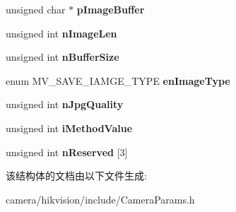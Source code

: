 \begin{DoxyCompactItemize}
unsigned char $\ast$ {\bfseries p\+Image\+Buffer}
\item 
\mbox{\label{struct___m_v___s_a_v_e___i_m_a_g_e___p_a_r_a_m___t___e_x___a0205541f5183ed37ed08929200246b70}} 
unsigned int {\bfseries n\+Image\+Len}
\item 
\mbox{\label{struct___m_v___s_a_v_e___i_m_a_g_e___p_a_r_a_m___t___e_x___a0ebe9f2d85d4b5204df69b5b857420a6}} 
unsigned int {\bfseries n\+Buffer\+Size}
\item 
\mbox{\label{struct___m_v___s_a_v_e___i_m_a_g_e___p_a_r_a_m___t___e_x___a3828a521345bf5d02d8fc4edfde87cee}} 
enum M\+V\+\_\+\+S\+A\+V\+E\+\_\+\+I\+A\+M\+G\+E\+\_\+\+T\+Y\+PE {\bfseries en\+Image\+Type}
\item 
\mbox{\label{struct___m_v___s_a_v_e___i_m_a_g_e___p_a_r_a_m___t___e_x___a14c69f55bfdc48d975534395a95aff03}} 
unsigned int {\bfseries n\+Jpg\+Quality}
\item 
\mbox{\label{struct___m_v___s_a_v_e___i_m_a_g_e___p_a_r_a_m___t___e_x___a66f0092c6e217ac72d484f382233f197}} 
unsigned int {\bfseries i\+Method\+Value}
\item 
\mbox{\label{struct___m_v___s_a_v_e___i_m_a_g_e___p_a_r_a_m___t___e_x___a23bcf831860e8aadda065bc22642400e}} 
unsigned int {\bfseries n\+Reserved} \mbox{[}3\mbox{]}
\end{DoxyCompactItemize}


该结构体的文档由以下文件生成\+:\begin{DoxyCompactItemize}
\item 
camera/hikvision/include/Camera\+Params.\+h\end{DoxyCompactItemize}
